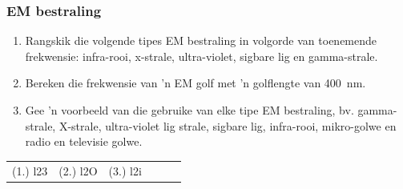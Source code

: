                \subsubsection*{EM bestraling}
            \nopagebreak
      \label{m38778*id188768}\begin{enumerate}[noitemsep, label=\textbf{\arabic*}. ] 
            \label{m38778*uid10}\item Rangskik die volgende tipes EM bestraling in volgorde van toenemende frekwensie: infra-rooi, x-strale, ultra-violet, sigbare lig en gamma-strale.\newline
\label{m38778*uid11}\item Bereken die frekwensie van 'n EM golf met 'n golflengte van 400~nm.\newline
\label{m38778*uid12}\item Gee 'n voorbeeld van die gebruike van elke tipe EM bestraling, bv. gamma-strale, X-strale, ultra-violet lig strale, sigbare lig, infra-rooi, mikro-golwe en radio en televisie golwe.\newline
\end{enumerate}
    \label{m38778*cid6}
\practiceinfo
 \par \begin{tabular}[h]{cccccc}
 (1.) l23  &  (2.) l2O  &  (3.) l2i  & \end{tabular}


